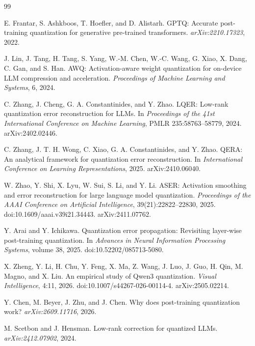 \documentclass[11pt]{article}
\begin{document}
\begin{thebibliography}{99}

E. Frantar, S. Ashkboos, T. Hoefler, and D. Alistarh.
\newblock GPTQ: Accurate post-training quantization for generative pre-trained transformers.
\newblock \emph{arXiv:2210.17323}, 2022.

J. Lin, J. Tang, H. Tang, S. Yang, W.-M. Chen, W.-C. Wang, G. Xiao, X. Dang, C. Gan, and S. Han.
\newblock AWQ: Activation-aware weight quantization for on-device LLM compression and acceleration.
\newblock \emph{Proceedings of Machine Learning and Systems}, 6, 2024.

C. Zhang, J. Cheng, G. A. Constantinides, and Y. Zhao.
\newblock LQER: Low-rank quantization error reconstruction for LLMs.
\newblock In \emph{Proceedings of the 41st International Conference on Machine Learning}, PMLR 235:58763--58779, 2024. arXiv:2402.02446.

C. Zhang, J. T. H. Wong, C. Xiao, G. A. Constantinides, and Y. Zhao.
\newblock QERA: An analytical framework for quantization error reconstruction.
\newblock In \emph{International Conference on Learning Representations}, 2025. arXiv:2410.06040.

W. Zhao, Y. Shi, X. Lyu, W. Sui, S. Li, and Y. Li.
\newblock ASER: Activation smoothing and error reconstruction for large language model quantization.
\newblock \emph{Proceedings of the AAAI Conference on Artificial Intelligence}, 39(21):22822--22830, 2025. doi:10.1609/aaai.v39i21.34443. arXiv:2411.07762.

Y. Arai and Y. Ichikawa.
\newblock Quantization error propagation: Revisiting layer-wise post-training quantization.
\newblock In \emph{Advances in Neural Information Processing Systems}, volume 38, 2025. doi:10.52202/085713-5080.

X. Zheng, Y. Li, H. Chu, Y. Feng, X. Ma, Z. Wang, J. Luo, J. Guo, H. Qin, M. Magno, and X. Liu.
\newblock An empirical study of Qwen3 quantization.
\newblock \emph{Visual Intelligence}, 4:11, 2026. doi:10.1007/s44267-026-00114-4. arXiv:2505.02214.

Y. Chen, M. Beyer, J. Zhu, and J. Chen.
\newblock Why does post-training quantization work?
\newblock \emph{arXiv:2609.11716}, 2026.

M. Scetbon and J. Hensman.
\newblock Low-rank correction for quantized LLMs.
\newblock \emph{arXiv:2412.07902}, 2024.


\end{thebibliography}
\end{document}
